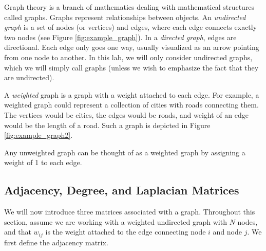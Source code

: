 %
%



Graph theory is a branch of mathematics dealing with mathematical structures called graphs.  Graphs represent relationships between objects.
An \emph{undirected graph} is a set of nodes (or vertices) and edges, where each edge connects exactly two nodes (see Figure \ref{fig:example_graph}).
In a \emph{directed graph}, edges are directional. Each edge only goes one way, usually visualized as an arrow pointing from one node to another.
In this lab, we will only consider undirected graphs, which we will simply call graphs (unless we wish to emphasize the fact that they are undirected).


A \emph{weighted} graph is a graph with a weight attached to each edge.
For example, a weighted graph could represent a collection of cities with roads connecting them.
The vertices would be cities, the edges would be roads, and weight of an edge would be the length of a road.
Such a graph is depicted in Figure \ref{fig:example_graph2}.

Any unweighted graph can be thought of as a weighted graph by assigning a weight of 1 to each edge.

\subsection*{Adjacency, Degree, and Laplacian Matrices}
We will now introduce three matrices associated with a graph. 
Throughout this section, assume we are working with a weighted undirected graph with $N$ nodes, and that $w_{ij}$ is the weight attached to the edge connecting node $i$ and node $j$.
We first define the adjacency matrix.

